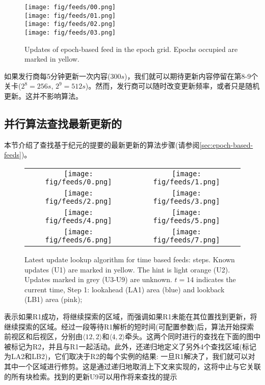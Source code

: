 \begin{figure}[htbp]
\centering
\texttt{[image: fig/feeds/00.png]}\\
\texttt{[image: fig/feeds/01.png]}\\
\texttt{[image: fig/feeds/02.png]}\\
\texttt{[image: fig/feeds/03.png]}
\caption[Updates of epoch-based feed in the epoch grid]{Updates of epoch-based feed in the epoch grid. Epochs occupied are marked in yellow. }
\label{fig:feeds-update}
\end{figure}

如果发行商每5分钟更新一次内容($300s$)，我们就可以期待更新内容停留在第8-9个关卡($2^8 = 256s$, $2^9 = 512s$)。然而，发行商可以随时改变更新频率，或者只是随机更新。这并不影响算法。

\subsection*{并行算法查找最新更新的\statusorange}\label{sec:feeds-lookup-algo}

本节介绍了查找基于纪元的提要的最新更新的算法步骤(请参阅\ref{sec:epoch-based-feeds})。

\begin{figure}[htbp]
\centering
\begin{tabular}{c|c}
\texttt{[image: fig/feeds/0.png]}&\texttt{[image: fig/feeds/1.png]}\\
\texttt{[image: fig/feeds/2.png]}&\texttt{[image: fig/feeds/3.png]}\\
\texttt{[image: fig/feeds/4.png]}&\texttt{[image: fig/feeds/5.png]}\\
\texttt{[image: fig/feeds/6.png]}&\texttt{[image: fig/feeds/7.png]}
\end{tabular}
\caption[Latest update lookup algorithm for time based feeds]{Latest update lookup algorithm for time based feeds: steps. Known updates (U1) are marked in yellow. The hint is light orange (U2). Updates marked in grey (U3-U9) are unknown. $t=14$ indicates the current time, Step 1: lookahead (LA1) area (blue) and lookback (LB1) area (pink); }
\label{fig:feeds-lookup-1}
\end{figure}

表示如果R1成功，将继续探索的区域，而强调如果R1未能在其位置找到更新，将继续探索的区域。经过一段等待R1解析的短时间(可配置参数)后，算法开始探索前视区和后视区，分别由$\langle  12, 2 \rangle$和$\langle  4, 2 \rangle$牵头。这两个同时进行的查找在下面的图中被标记为R2，并且与R1一起活动。此外，还递归地定义了另外4个查找区域(标记为LA2和LB2)，它们取决于R2的每个实例的结果:
一旦R1解决了，我们就可以对其中一个区域进行修剪。这是通过递归地取消上下文来实现的，这将中止与它关联的所有块检索。找到的更新U9可以用作将来查找的提示

